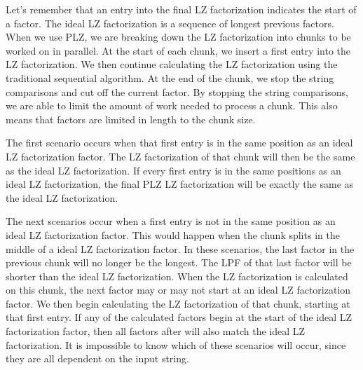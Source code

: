 Let's remember that an entry into the final LZ factorization indicates the start of a factor.
The ideal LZ factorization is a sequence of longest previous factors.
When we use PLZ, we are breaking down the LZ factorization into chunks to be worked on in parallel.
At the start of each chunk, we insert a first entry into the LZ factorization.
We then continue calculating the LZ factorization using the traditional sequential algorithm.
At the end of the chunk, we stop the string comparisons and cut off the current factor.
By stopping the string comparisons, we are able to limit the amount of work needed to process a chunk.
This also means that factors are limited in length to the chunk size.

The first scenario occurs when that first entry is in the same position as an ideal LZ factorization factor.
The LZ factorization of that chunk will then be the same as the ideal LZ factorization.
If every first entry is in the same positions as an ideal LZ factorization, the final PLZ LZ factorization will be exactly the same as the ideal LZ factorization.

The next scenarios occur when a first entry is not in the same position as an ideal LZ factorization factor.
This would happen when the chunk splits in the middle of a ideal LZ factorization factor.
In these scenarios, the last factor in the previous chunk will no longer be the longest.
The LPF of that last factor will be shorter than the ideal LZ factorization.
When the LZ factorization is calculated on this chunk, the next factor may or may not start at an ideal LZ factorization factor.
We then begin calculating the LZ factorization of that chunk, starting at that first entry.
If any of the calculated factors begin at the start of the ideal LZ factorization factor, then all factors after will also match the ideal LZ factorization.
It is impossible to know which of these scenarios will occur, since they are all dependent on the input string.

